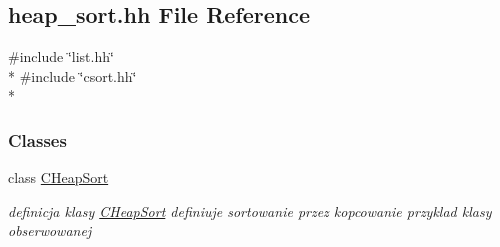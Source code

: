 \hypertarget{heap__sort_8hh}{}\subsection{heap\+\_\+sort.\+hh File Reference}
\label{heap__sort_8hh}
{\ttfamily \#include \char`\"{}list.\+hh\char`\"{}}\\*
{\ttfamily \#include \char`\"{}csort.\+hh\char`\"{}}\\*
\subsubsection*{Classes}
\begin{DoxyCompactItemize}
\item 
class \hyperlink{class_c_heap_sort}{C\+Heap\+Sort}
\begin{DoxyCompactList}\small\item\em definicja klasy \hyperlink{class_c_heap_sort}{C\+Heap\+Sort} definiuje sortowanie przez kopcowanie przyklad klasy obserwowanej \end{DoxyCompactList}\end{DoxyCompactItemize}
